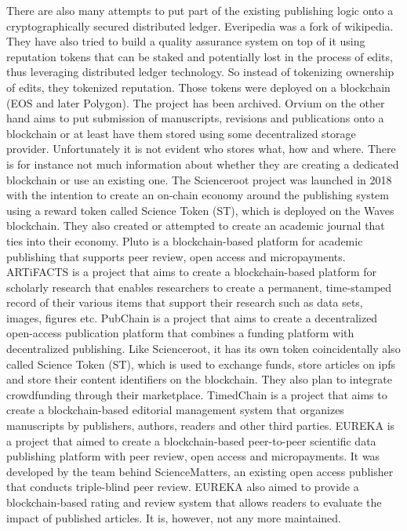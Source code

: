 \documentclass[14pt]{article}
\begin{document}
There are also many attempts to put part of the existing publishing logic onto a cryptographically secured distributed ledger. Everipedia\cite{forselius_everipedia} was a fork of wikipedia. They have also tried to build a quality assurance system on top of it using reputation tokens that can be staked and potentially lost in the process of edits, thus leveraging distributed ledger technology. So instead of tokenizing ownership of edits, they tokenized reputation. Those tokens were deployed on a blockchain (EOS and later Polygon). The project has been archived. Orvium \cite{romero_orvium} on the other hand aims to put submission of manuscripts, revisions and publications onto a blockchain or at least have them stored using some decentralized storage provider. Unfortunately it is not evident who stores what, how and where. There is for instance not much information about whether they are creating a dedicated blockchain or use an existing one.
The Scienceroot project \cite{tintas_scienceroot} was launched in 2018 with the intention to create an on-chain economy around the publishing system using a reward token called Science Token (ST), which is deployed on the Waves blockchain. They also created or attempted to create an academic journal that ties into their economy. Pluto\cite{kang_pluto} is a blockchain-based platform for academic publishing that supports peer review, open access and micropayments. ARTiFACTS\cite{artifacts_team} is a project that aims to create a blockchain-based platform for scholarly research that enables researchers to create a permanent, time-stamped record of their various items that support their research such as data sets, images, figures etc. 
PubChain\cite{pubpub_team} is a project that aims to create a decentralized open-access publication platform that combines a funding platform with decentralized publishing. Like Scienceroot, it has its own token coincidentally also called Science Token (ST), which is used to exchange funds, store articles on ipfs and store their content identifiers on the blockchain. They also plan to integrate crowdfunding through their marketplace. TimedChain \cite{timedchain_team} is a project that aims to create a blockchain-based editorial management system that organizes manuscripts by publishers, authors, readers and other third parties. EUREKA \cite{schaufelbuhl2019eureka} is a project that aimed to create a blockchain-based peer-to-peer scientific data publishing platform with peer review, open access and micropayments. It was developed by the team behind ScienceMatters, an existing open access publisher that conducts triple-blind peer review. EUREKA also aimed to provide a blockchain-based rating and review system that allows readers to evaluate the impact of published articles. It is, however, not any more maintained. 
\end{document}

